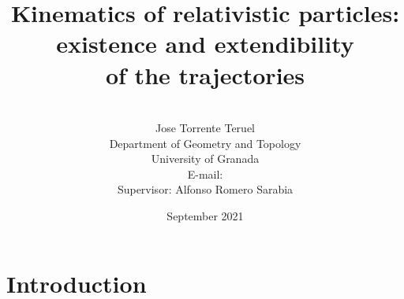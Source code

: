 \documentclass[11pt]{book}
\begin{document}
	
	
\title{\Huge Kinematics of relativistic particles: \\
existence and extendibility \\ of the trajectories}


\vfill

\author{\\[2cm] Jose Torrente Teruel \\ Department of Geometry and
	Topology\\ University of Granada
	\\E-mail: \\[30mm]
	Supervisor: Alfonso Romero Sarabia \\[20mm]}

\date{September 2021}


\maketitle



\markboth{}{}


\thispagestyle{empty}

\newpage
	
	\newpage
	\thispagestyle{empty}
	\tableofcontents
	\thispagestyle{empty}
	
	\newpage
	
	\pagestyle{empty}
	\fancyhead[RO,LE]{\leftmark}
	\fancyhead[LO,RE]{\thepage}
	\fancyfoot{}


\chapter*{Introduction}
\end{document}
